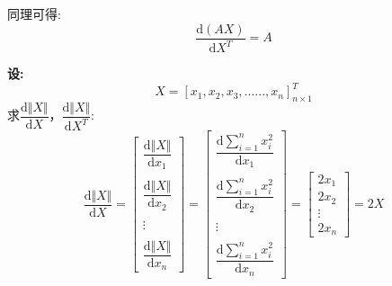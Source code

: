 \documentclass[withoutpreface,bwprint]{cumcmthesis} %
\begin{document}
	同理可得:
	\begin{equation}
			\dfrac{\mathrm{d } (AX)}{\mathrm{d} X^T}=A
	\end{equation}
	\par \textbf{设:}
	\begin{equation*}
		X=\left[
			x_1,x_2,x_3,......,x_n
		\right]^T_{n{\times}1}
	\end{equation*}
	求$\dfrac{\mathrm{d} \Vert X \Vert}{\mathrm{d} X}$，$\dfrac{\mathrm{d} \Vert X \Vert}{\mathrm{d} X^T}$:
	\begin{equation}
		\dfrac{\mathrm{d} \Vert X \Vert}{\mathrm{d} X}
		=
		\left[
			\begin{array}{c}
				\dfrac{\mathrm{d} \Vert X \Vert}{\mathrm{d} x_1}\\\\
				\dfrac{\mathrm{d} \Vert X \Vert}{\mathrm{d} x_2}\\\\
				\vdots\\\\
				\dfrac{\mathrm{d} \Vert X \Vert}{\mathrm{d} x_n}
			\end{array}
		\right]
		=
		\left[
		\begin{array}{c}
			\dfrac{\mathrm{d} \sum_{i=1}^{n} x_i^2}{\mathrm{d} x_1}\\\\
			\dfrac{\mathrm{d} \sum_{i=1}^{n} x_i^2}{\mathrm{d} x_2}\\\\
			\vdots\\\\
			\dfrac{\mathrm{d} \sum_{i=1}^{n} x_i^2}{\mathrm{d} x_n}
		\end{array}
		\right]
		=
		\left[
		\begin{array}{c}
			2x_1\\
			2x_2\\
			\vdots\\
			2x_n
		\end{array}
		\right]
		=
		2X
	\end{equation}
\end{document}

